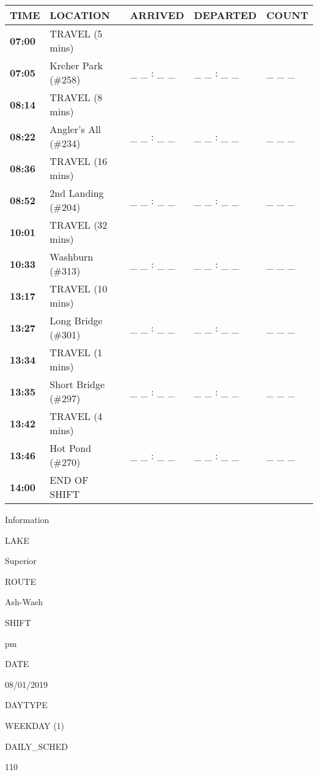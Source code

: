 \documentclass[]{article}
\begin{document}
\begin{tabular}{>{\bfseries}lllll}
\toprule
\textbf{TIME} & \textbf{LOCATION} & \textbf{ARRIVED} & \textbf{DEPARTED} & \textbf{COUNT}\\
\midrule
07:00 & TRAVEL (5 mins) &  &  & \\
07:05 & Kreher Park (\#258) & \_ \_ : \_ \_ & \_ \_ : \_ \_ & \_ \_ \_\\
08:14 & TRAVEL (8 mins) &  &  & \\
08:22 & Angler's All (\#234) & \_ \_ : \_ \_ & \_ \_ : \_ \_ & \_ \_ \_\\
08:36 & TRAVEL (16 mins) &  &  & \\
08:52 & 2nd Landing (\#204) & \_ \_ : \_ \_ & \_ \_ : \_ \_ & \_ \_ \_\\
10:01 & TRAVEL (32 mins) &  &  & \\
10:33 & Washburn (\#313) & \_ \_ : \_ \_ & \_ \_ : \_ \_ & \_ \_ \_\\
13:17 & TRAVEL (10 mins) &  &  & \\
13:27 & Long Bridge (\#301) & \_ \_ : \_ \_ & \_ \_ : \_ \_ & \_ \_ \_\\
13:34 & TRAVEL (1 mins) &  &  & \\
13:35 & Short Bridge (\#297) & \_ \_ : \_ \_ & \_ \_ : \_ \_ & \_ \_ \_\\
13:42 & TRAVEL (4 mins) &  &  & \\
13:46 & Hot Pond (\#270) & \_ \_ : \_ \_ & \_ \_ : \_ \_ & \_ \_ \_\\
14:00 & END OF SHIFT &  &  & \\
\bottomrule
\end{tabular}\newpage

Information

LAKE

Superior

ROUTE

Ash-Wash

SHIFT

pm

DATE

08/01/2019

DAYTYPE

WEEKDAY (1)

DAILY\_SCHED

110

\vspace{24pt}
\end{document}
